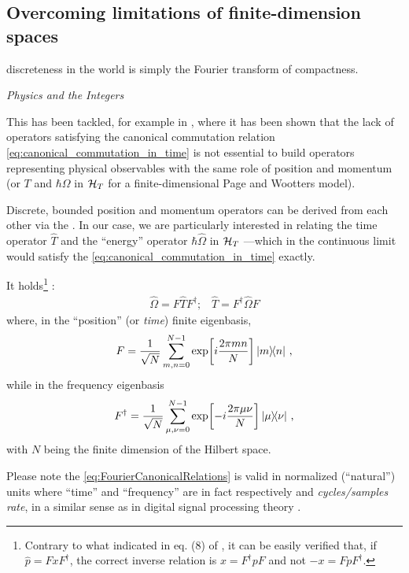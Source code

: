 \subsection{Overcoming limitations of finite-dimension spaces}

\epigraph{\textelp{} discreteness in the world is simply the Fourier transform of compactness.}{
  \emph{Physics and the Integers} \parencite{Tong_Integers}
}

\noindent{}This has been tackled, for example in
\cite{FiniteHilb},
where it has been shown that the lack of operators satisfying the canonical
commutation relation \eqref{eq:canonical_commutation_in_time}
is not essential to build operators representing physical observables
with the same role of position and momentum (or $T$ and $\hbar\Omega$
in $\mathcal{H}_T$ for a finite-dimensional Page and Wootters model).

Discrete, bounded position and momentum operators can be derived from
each other via
the .
In our case, we are particularly interested in relating the
time operator $\hat{T}$ and the ``energy'' operator $\hbar\hat{\Omega}$
in $\mathcal{H}_T$ ---which in the continuous limit would satisfy the
\eqref{eq:canonical_commutation_in_time} exactly.

It holds\footnote{
  Contrary to what indicated in eq. (8) of \cite{FiniteHilb},
  it can be easily verified that,
  if $ \hat{p} = F x F^{\dagger} $,
  the correct inverse relation is
  $ x = F^{\dagger} p F$ and not $ -x = F p F^{\dagger} $.
} \parencite{FiniteHilb}:
\begin{gather}\label{eq:FourierCanonicalRelations}
  \hat{\Omega} = F \hat{T} F^{\dagger}\text{;} \quad
  \hat{T} = F^{\dagger} \hat{\Omega} F
\end{gather}
where, in the ``position'' (or \emph{time}) finite eigenbasis,
\begin{equation}
  F = \frac{1}{\sqrt{N}} \sum_{m,n=0}^{N-1} \exp[i\frac{2\pi mn}{N}] \ketbra{m}{n} \, \text{,}
\end{equation}
while in the frequency eigenbasis
\begin{equation}
  F^{\dagger} = \frac{1}{\sqrt{N}} \sum_{\mu,\nu=0}^{N-1} \exp[-i\frac{2\pi \mu\nu}{N}] \ketbra{\mu}{\nu} \, \text{,}
\end{equation}
with $N$ being the finite dimension of the Hilbert space.

Please note the \eqref{eq:FourierCanonicalRelations} is valid in normalized (``natural'') units
where ``time'' and ``frequency'' are in fact respectively
 and \emph{cycles/samples rate},
in a similar sense as in digital signal processing theory
\parencite[pp. 469, 490]{Signal}.

